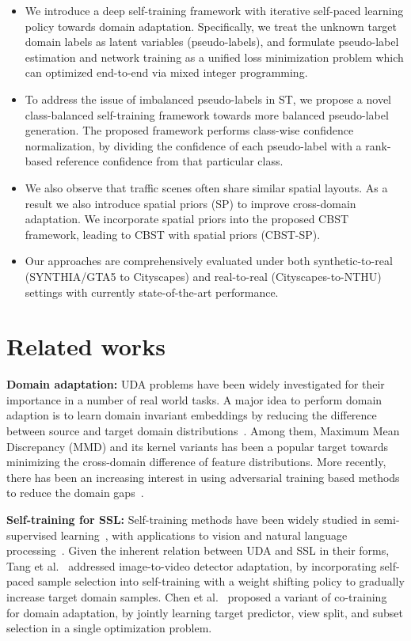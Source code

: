 \documentclass[runningheads]{llncs}
\begin{document}
\begin{itemize}
  \item We introduce a deep self-training framework with iterative self-paced learning policy towards domain adaptation. Specifically, we treat the unknown target domain labels as latent variables (pseudo-labels), and formulate pseudo-label estimation and network training as a unified loss minimization problem which can optimized end-to-end via mixed integer programming.
  \item To address the issue of imbalanced pseudo-labels in ST, we propose a novel class-balanced self-training framework towards more balanced pseudo-label generation. The proposed framework performs class-wise confidence normalization, by dividing the confidence of each pseudo-label with a rank-based reference confidence from that particular class.
  \item We also observe that traffic scenes often share similar spatial layouts. As a result we also introduce spatial priors (SP) to improve cross-domain adaptation. We incorporate spatial priors into the proposed CBST framework, leading to CBST with spatial priors (CBST-SP).
  \item Our approaches are comprehensively evaluated under both synthetic-to-real (SYNTHIA/GTA5 to Cityscapes) and real-to-real (Cityscapes-to-NTHU) settings with currently state-of-the-art performance.
\end{itemize}



\section{Related works}
\noindent\textbf{Domain adaptation:} UDA problems have been widely investigated for their importance in a number of real world tasks. A major idea to perform domain adaption is to learn domain invariant embeddings by reducing the difference between source and target domain distributions~\cite{tzeng2014deep,tzeng2015simultaneous,long2015learning,sun2016deep}. Among them, Maximum Mean Discrepancy (MMD) and its kernel variants has been a popular target towards minimizing the cross-domain difference of feature distributions. More recently, there has been an increasing interest in using adversarial training based methods to reduce the domain gaps~\cite{ajakan2014domain,tzeng2014deep,ganin2015unsupervised,ganin2016domain,Adda_CVPR2017}.

\noindent\textbf{Self-training for SSL:} Self-training methods have been widely studied in semi-supervised learning~\cite{chapelle2009semi,zhu2006semi}, with applications to vision and natural language processing~\cite{yarowsky1995unsupervised,riloff2003learning,maeireizo2004co,zhu2006semi}. Given the inherent relation between UDA and SSL in their forms, Tang et al.~\cite{tang2012shifting} addressed image-to-video detector adaptation, by incorporating self-paced sample selection into self-training with a weight shifting policy to gradually increase target domain samples. Chen et al.~\cite{chen2011co} proposed a variant of co-training~\cite{blum1998combining} for domain adaptation, by jointly learning target predictor, view split, and subset selection in a single optimization problem.
\end{document}
